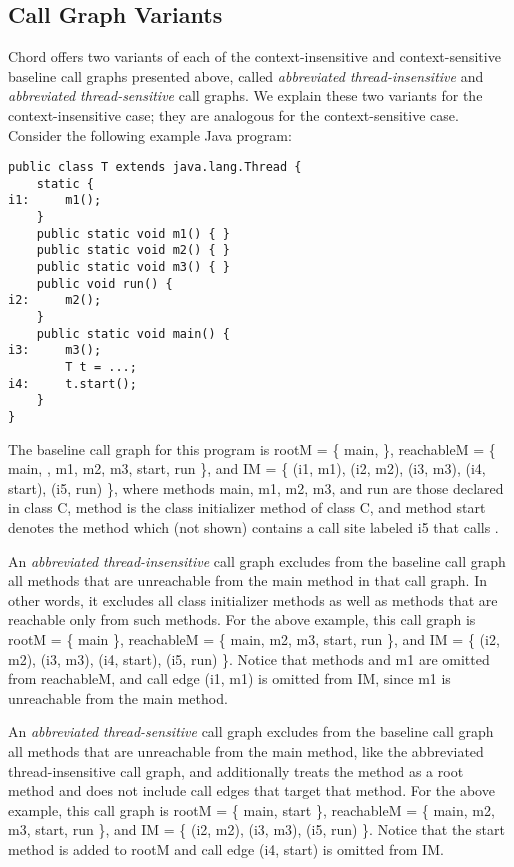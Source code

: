 \subsection{Call Graph Variants}

Chord offers two variants of each of the context-insensitive and
context-sensitive baseline call graphs presented above, called {\it abbreviated
thread-insensitive} and {\it abbreviated thread-sensitive} call graphs.  We
explain these two variants for the context-insensitive case; they are analogous
for the context-sensitive case.  Consider the following example Java program:

\begin{framed}
\begin{verbatim}
public class T extends java.lang.Thread {
    static {
i1:     m1();
    }
    public static void m1() { }
    public static void m2() { }
    public static void m3() { }
    public void run() {
i2:     m2();
    }
    public static void main() {
i3:     m3();
        T t = ...;
i4:     t.start();
    }
}
\end{verbatim}
\end{framed}

The baseline call graph for this program is 
rootM = \{ main,  \}, 
reachableM = \{ main, , m1, m2, m3, start, run \}, and
IM = \{ (i1, m1), (i2, m2), (i3, m3), (i4, start), (i5, run) \}, where methods
main, m1, m2, m3, and run are those declared in class C, method 
is the class initializer method of class C, and method start denotes the
 method which (not shown) contains a call site labeled i5 that calls
.

An {\it abbreviated thread-insensitive} call graph excludes from the baseline call
graph all methods that are unreachable from the main method in that call graph.  In other words, it
excludes all class initializer methods as well as methods that are reachable
only from such methods.
For the above example, this call graph is
rootM = \{ main \},
reachableM = \{ main, m2, m3, start, run \}, and
IM = \{ (i2, m2), (i3, m3), (i4, start), (i5, run) \}.  Notice that methods
 and m1 are omitted from reachableM, and call edge (i1, m1) is
omitted from IM, since m1 is unreachable from the main method.

An {\it abbreviated thread-sensitive} call graph excludes from the baseline call
graph all methods that are unreachable from the main method, like the
abbreviated thread-insensitive call graph, and additionally treats the
 method as a root method and does not include
call edges that target that method.
For the above example, this call graph is
rootM = \{ main, start \},
reachableM = \{ main, m2, m3, start, run \}, and
IM = \{ (i2, m2), (i3, m3), (i5, run) \}.  Notice that the start method is
added to rootM and call edge (i4, start) is omitted from IM.

